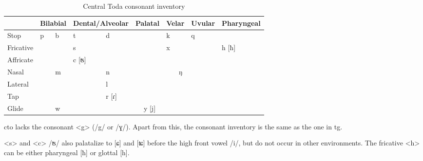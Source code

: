\begin{table}[!htbp]
\centering
\caption{Central Toda consonant inventory}
\label{tab:ctoC}
\begin{tabular}{l|ll|ll|ll|ll|ll|ll}
\hline
                    & \multicolumn{2}{c|}{Bilabial} & \multicolumn{2}{c|}{Dental/Alveolar} & \multicolumn{2}{c|}{Palatal} & \multicolumn{2}{c|}{Velar} & \multicolumn{2}{c|}{Uvular} & \multicolumn{2}{c}{Pharyngeal} \\ \hline
Stop                & p            & b           & t               & d               &             &               & k          &            & q            &            &                 &              \\
Fricative           &               &              & s               &                  &             &               & x          &             &               &            & h [ħ]             &              \\
Affricate           &               &              & c [ʦ]              &                  &             &               &             &             &               &            &                 &              \\
Nasal               &               & m           &                  & n               &             &               &             & ŋ          &               &            &                 &              \\
Lateral &               &              &                  & l               &             &               &             &             &               &            &                 &              \\
Tap                 &               &              &                  & r [ɾ]              &             &               &             &             &               &            &                 &              \\
Glide               &               & w           &                  &                  &             & y [j]           &             &             &               &            &                 &              \\ \hline
\end{tabular}
\end{table}

\acl{cto} lacks the consonant <g> (/g/ or /ɣ/). Apart from this, the consonant inventory is the same as the one in \acl{tg}. 

<s> and <c> /ʦ/ also palatalize to [ɕ] and [ʨ] before the high front vowel /i/, but do not occur in other environments. The fricative <h> can be either pharyngeal [ħ] or glottal [h]. 

